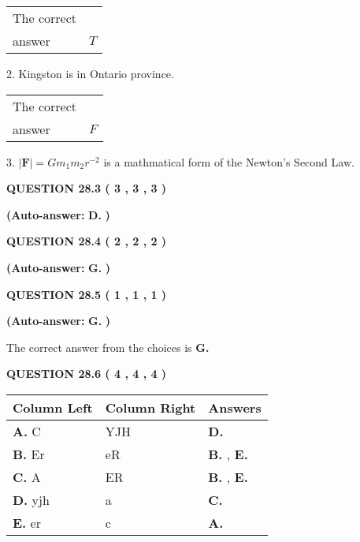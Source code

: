 \documentclass[12pt]{article}
\begin{document}
\noindent\begin{tabular}{|l|l|}\hline The correct & \\
          answer &  %
$T$ \\ \hline \end{tabular}
2.  %
Kingston is in  %
Ontario province.
 
\noindent\begin{tabular}{|l|l|}\hline The correct & \\
          answer &  %
$F$ \\ \hline \end{tabular}
3.  %
$\left| \mathbf{F}\right| =Gm_1m_2r^{-2}$ is a mathmatical form of  %
the Newton's Second Law.
 
  
  
{\textbf{\large{QUESTION
28.3 
 (           3 ,           3 ,           3 )
}}}
 
 
{\textbf{(Auto-answer:}}
{\textbf{\large{
D.}}}
{\textbf{)}}
 
 
  
  
{\textbf{\large{QUESTION
28.4 
 (           2 ,           2 ,           2 )
}}}
 
 
{\textbf{(Auto-answer:}}
{\textbf{\large{
G.}}}
{\textbf{)}}
 
 
  
  
{\textbf{\large{QUESTION
28.5 
 (           1 ,           1 ,           1 )
}}}
 
 
{\textbf{(Auto-answer:}}
{\textbf{\large{
G.}}}
{\textbf{)}}
 
 

The correct answer from the choices is
{\textbf{\large{
G.}}}
 
  
  
{\textbf{\large{QUESTION
28.6 
 (           4 ,           4 ,           4 )
}}}
 
 
\noindent{}
  
  
\begin{tabular}{|l|l|l|}
 \hline
 Column Left & Column Right  & Answers       \\ 
 \hline
{\textbf{\large{
A.}}}
C
  & 
YJH
 & 
{\textbf{\large{
D.}}}
 \\ 
 \hline
{\textbf{\large{
B.}}}
Er
  & 
eR
 & 
{\textbf{\large{
B.}}}
, 
{\textbf{\large{
E.}}}
 \\ 
 \hline
{\textbf{\large{
C.}}}
A
  & 
ER
 & 
{\textbf{\large{
B.}}}
, 
{\textbf{\large{
E.}}}
 \\ 
 \hline
{\textbf{\large{
D.}}}
yjh
  & 
a
 & 
{\textbf{\large{
C.}}}
 \\ 
 \hline
{\textbf{\large{
E.}}}
er
  & 
c
 & 
{\textbf{\large{
A.}}}
 \\ 
 \hline
 \end{tabular}
  
\end{document}
